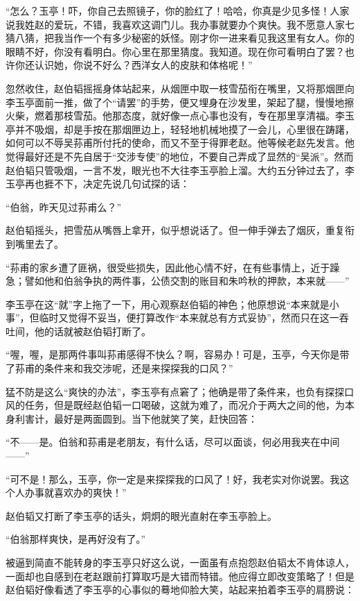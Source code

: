 \par “怎么？玉亭！吓，你自己去照镜子，你的脸红了！哈哈，你真是少见多怪！人家说我姓赵的爱玩，不错，我喜欢这调门儿。我办事就要办个爽快。我不愿意人家七猜八猜，把我当作一个有多少秘密的妖怪。刚才你一进来看见我这里有女人。你的眼睛不好，你没有看明白。你心里在那里猜度。我知道。现在你可看明白了罢？也许你还认识她，你说不好么？西洋女人的皮肤和体格呢！”
\par 忽然收住，赵伯韬摇摇身体站起来，从烟匣中取一枝雪茄衔在嘴里，又将那烟匣向李玉亭面前一推，做了个“请罢”的手势，便又埋身在沙发里，架起了腿，慢慢地擦火柴，燃着那枝雪茄。他那态度，就好像一点心事也没有，专在那里享清福。李玉亭并不吸烟，却是手按在那烟匣边上，轻轻地机械地摸了一会儿，心里很在踌躇，如何可以不辱吴荪甫所付托的使命，而又不至于得罪老赵。他等候老赵先发言。他觉得最好还是不先自居于“交涉专使”的地位，不要自己弄成了显然的“吴派”。然而赵伯韬只管吸烟，一言不发，眼光也不大往李玉亭脸上溜。大约五分钟过去了，李玉亭再也捱不下，决定先说几句试探的话：
\par “伯翁，昨天见过荪甫么？”
\par 赵伯韬摇头，把雪茄从嘴唇上拿开，似乎想说话了。但一伸手弹去了烟灰，重复衔到嘴里去了。
\par “荪甫的家乡遭了匪祸，很受些损失，因此他心情不好，在有些事情上，近于躁急；譬如他和伯翁争执的两件事，公债交割的账目和朱吟秋的押款，本来就——”
\par 李玉亭在这“就”字上拖了一下，用心观察赵伯韬的神色；他原想说“本来就是小事”，但临时又觉得不妥当，便打算改作“本来就总有方式妥协”，然而只在这一吞吐间，他的话就被赵伯韬打断了。
\par “喔，喔，是那两件事叫荪甫感得不快么？啊，容易办！可是，玉亭，今天你是带了荪甫的条件来和我交涉呢，还是来探探我的口风？”
\par 猛不防是这么“爽快的办法”，李玉亭有点窘了；他确是带了条件来，也负有探探口风的任务，但是既经赵伯韬一口喝破，这就为难了，而况介于两大之间的他，为本身利害计，最好是两面圆到。当下他就笑了笑，赶快回答：
\par “不——是。伯翁和荪甫是老朋友，有什么话，尽可以面谈，何必用我夹在中间——”
\par “可不是！那么，玉亭，你一定是来探探我的口风了！好，我老实对你说罢。我这个人办事就喜欢办的爽快！”
\par 赵伯韬又打断了李玉亭的话头，炯炯的眼光直射在李玉亭脸上。
\par “伯翁那样爽快，是再好没有了。”
\par 被逼到简直不能转身的李玉亭只好这么说，一面虽有点抱怨赵伯韬太不肯体谅人，一面却也自感到在老赵跟前打算取巧是大错而特错。他应得立即改变策略了！但是赵伯韬好像看透了李玉亭的心事似的蓦地仰脸大笑，站起来拍着李玉亭的肩膀说：
